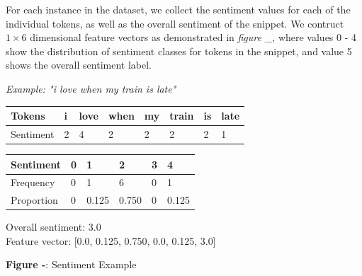 \documentclass[12pt,a4paper]{article}
\begin{document}
\hspace{-18pt}\begin{minipage}{0.4\textwidth}
	\vspace{-3pt}
	For each instance in the dataset, we collect the sentiment values for each of the individual tokens, as well as the overall sentiment of the snippet. We contruct $ 1 \times 6 $ dimensional feature vectors as demonstrated in \textit{figure \_}, where values 0 - 4 show the distribution of sentiment classes for tokens in the snippet, and value 5 shows the overall sentiment label.\\
\end{minipage}\hspace{15pt}\begin{minipage}{0.55\textwidth}
	\vspace{-10pt}\textit{Example: "i love when my train is late"}\vspace{-15pt}
	\begin{center}	
		\begin{tabular}{|m{1.8cm}||m{0.4cm}m{0.6cm}m{0.75cm}m{0.4cm}m{0.7cm}m{0.2cm}m{0.6cm}|}
			\hline 
			\textbf{Tokens} & \textbf{i} & \textbf{love} & \textbf{when} & \textbf{my} & \textbf{train} & \textbf{is} & \textbf{late}\\ 
			\hline 
			Sentiment & 2 & 4 & 2 & 2 & 2 & 2 & 1\\ 
			\hline 
		\end{tabular}
		\vspace{5pt}
		
		\begin{tabular}{|p{1.8cm}||p{0.9cm}|p{0.9cm}|p{0.9cm}|p{0.9cm}|p{0.9cm}|} 
			\hline 
			\textbf{Sentiment} & \textbf{0} & \textbf{1} & \textbf{2} & \textbf{3} & \textbf{4}\\ 
			\hline 
			Frequency & 0 & 1 & 6 & 0 & 1\\ 
			Proportion & 0 & 0.125 & 0.750 & 0 & 0.125\\
			\hline  
		\end{tabular}
	\end{center}
	Overall sentiment: 3.0\\
	Feature vector: [0.0, 0.125, 0.750, 0.0, 0.125, 3.0]\\\vspace{-20pt}
	\begin{center}
		\textbf{Figure -}: Sentiment Example
	\end{center}
\end{minipage}
\end{document}
